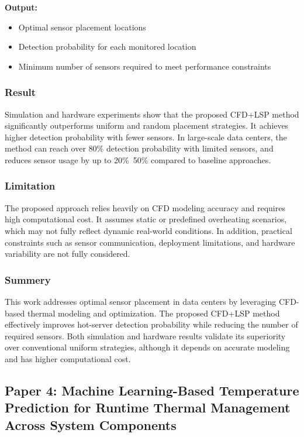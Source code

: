 \documentclass[12pt,a4paper]{article}
\begin{document}
            \textbf{Output:}
            \begin{itemize}
                \item Optimal sensor placement locations
                \item Detection probability for each monitored location
                \item Minimum number of sensors required to meet performance constraints
            \end{itemize}

    \subsubsection{Result}
    
            Simulation and hardware experiments show that the proposed CFD+LSP method significantly outperforms uniform and random placement strategies. It achieves higher detection probability with fewer sensors. In large-scale data centers, the method can reach over 80\% detection probability with limited sensors, and reduces sensor usage by up to 20\%~50\% compared to baseline approaches.

    
    \subsubsection{Limitation}

            The proposed approach relies heavily on CFD modeling accuracy and requires high computational cost. It assumes static or predefined overheating scenarios, which may not fully reflect dynamic real-world conditions. In addition, practical constraints such as sensor communication, deployment limitations, and hardware variability are not fully considered.

    \subsubsection{Summery}   
            
            This work addresses optimal sensor placement in data centers by leveraging CFD-based thermal modeling and optimization. The proposed CFD+LSP method effectively improves hot-server detection probability while reducing the number of required sensors. Both simulation and hardware results validate its superiority over conventional uniform strategies, although it depends on accurate modeling and has higher computational cost.
\newpage
 
\subsection{Paper 4: Machine Learning-Based Temperature Prediction for Runtime Thermal Management Across System Components}
            
\end{document}
